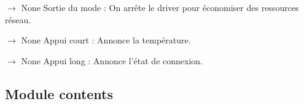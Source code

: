 \documentclass[letterpaper,10pt,french]{sphinxmanual}
\begin{document}
\begin{fulllineitems}

\begin{fulllineitems}
\label{\detokenize{api/modes:modes.mode_thermometer.ModeThermometre.on_exit}}
\pysigstartsignatures
\pysiglinewithargsret
{}
{}
{{ $\rightarrow$ None}}
\pysigstopsignatures
\sphinxAtStartPar
Sortie du mode :
On arrête le driver pour économiser des ressources réseau.

\end{fulllineitems}


\begin{fulllineitems}
\label{\detokenize{api/modes:modes.mode_thermometer.ModeThermometre.on_short_press}}
\pysigstartsignatures
\pysiglinewithargsret
{}
{}
{{ $\rightarrow$ None}}
\pysigstopsignatures
\sphinxAtStartPar
Appui court : Annonce la température.

\end{fulllineitems}


\begin{fulllineitems}
\label{\detokenize{api/modes:modes.mode_thermometer.ModeThermometre.on_long_press}}
\pysigstartsignatures
\pysiglinewithargsret
{}
{}
{{ $\rightarrow$ None}}
\pysigstopsignatures
\sphinxAtStartPar
Appui long : Annonce l’état de connexion.

\end{fulllineitems}


\end{fulllineitems}



\subsection{Module contents}
\label{\detokenize{api/modes:module-modes}}\label{\detokenize{api/modes:module-contents}}
\end{document}
